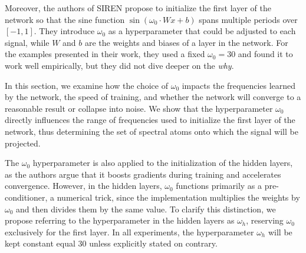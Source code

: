 Moreover, the authors of SIREN propose to initialize the first layer of the network so that the sine function $\sin(\omega_0 \cdot W x + b)$ spans multiple periods over $[-1, 1]$. They introduce $\omega_0$ as a hyperparameter that could be adjusted to each signal, while $W$ and $b$ are the weights and biases of a layer in the network. For the examples presented in their work, they used a fixed $\omega_0=30$ and found it to work well empirically, but they did not dive deeper on the \emph{why}.



In this section, we examine how the choice of \(\omega_0\) impacts the frequencies learned by the network, the speed of training, and whether the network will converge to a reasonable result or collapse into noise. We show that the hyperparameter \(\omega_0\) directly influences the range of frequencies used to initialize the first layer of the network, thus determining the set of spectral atoms onto which the signal will be projected. 

The $\omega_0$ hyperparameter is also applied to the initialization of the hidden layers, as the authors argue that it boosts gradients during training and accelerates convergence. However, in the hidden layers, \(\omega_0\) functions primarily as a pre-conditioner, a numerical trick, since the implementation multiplies the weights by \(\omega_0\) and then divides them by the same value. To clarify this distinction, we propose referring to the hyperparameter in the hidden layers as \(\omega_h\), reserving \(\omega_0\) exclusively for the first layer. In all experiments, the hyperparameter $\omega_h$ will be kept constant equal 30 unless explicitly stated on contrary.


